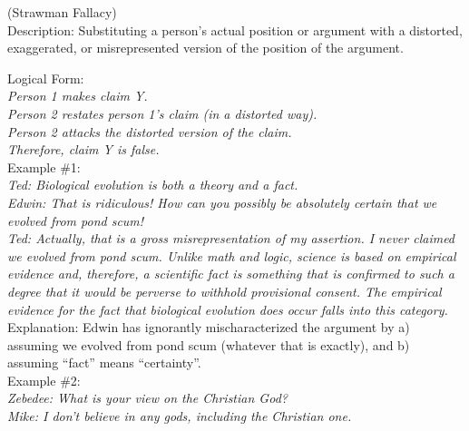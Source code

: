 \documentclass[a4paper,12pt,single,pdftex]{scrartcl}
\begin{document}
      (Strawman Fallacy)
    \\

  
    Description: Substituting a person’s actual position or argument with a distorted, exaggerated, or misrepresented version of the position of the argument.

    
      Logical Form:
    \\

    
      {\em Person 1 makes claim Y.}
    \\

    
      {\em Person 2 restates person 1’s claim (in a distorted way).}
    \\

    
      {\em Person 2 attacks the distorted version of the claim.}
    \\

    
      {\em Therefore, claim Y is false.}
    \\

    
      Example \#1:
    \\

    
      {\em Ted: Biological evolution is both a theory and a fact.}
    \\

    
      {\em Edwin: That is ridiculous!  How can you possibly be absolutely certain that we evolved from pond scum!}
    \\

    
      {\em Ted: Actually, that is a gross misrepresentation of my assertion.  I never claimed we evolved from pond scum.  Unlike math and logic, science is based on empirical evidence and, therefore, a scientific fact is something that is confirmed to such a degree that it would be perverse to withhold provisional consent.  The empirical evidence for the fact that biological evolution does occur falls into this category.}
    \\

    
      Explanation: Edwin has ignorantly mischaracterized the argument by a) assuming we evolved from pond scum (whatever that is exactly), and b) assuming “fact” means “certainty”.
    \\

    
      Example \#2:
    \\

    
      {\em Zebedee: What is your view on the Christian God?}
    \\

    
      {\em Mike: I don’t believe in any gods, including the Christian one.}
    \\
\end{document}
